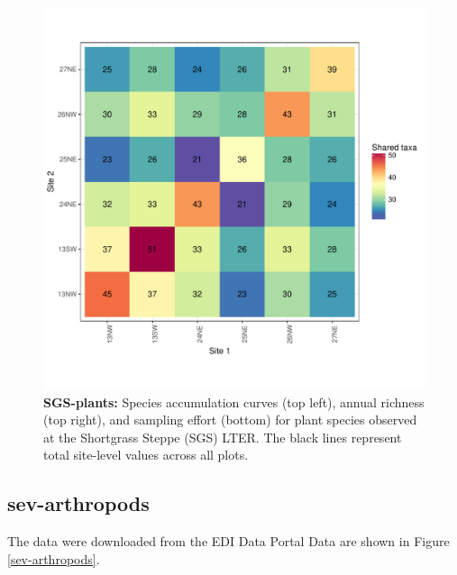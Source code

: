 \documentclass[11pt, oneside]{article}
\begin{document}
\begin{figure}[h!]
\includegraphics[scale = 0.4]{sgs-plants-catano_spp_shared.pdf}
\caption{{\bf SGS-plants:} Species accumulation curves (top left),  annual richness (top right), and sampling effort (bottom)  for plant species observed at the Shortgrass Steppe (SGS) LTER. The black lines represent total site-level values across all plots.}
\label{sgs-plants}
\end{figure}



\subsection {sev-arthropods}
The data were downloaded from the EDI Data Portal %
Data are shown in Figure \ref{sev-arthropods}.
  
\end{document}
